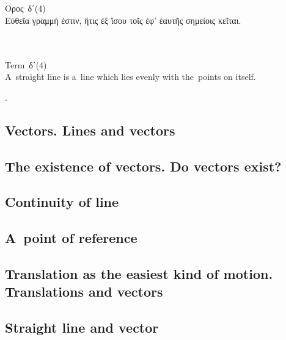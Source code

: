 {\small
\setlength{\parindent}{0pt}

\nopagebreak%
\begin{multicols}{2}
%
\\
\\[.3em]
\textgreek{Ορος}~\textgreek{δ΄}\:(4)\\[.1em]
\textgreek{Εὐθεῖα γραμμή ἐστιν, ἥτις ἐξ ἴσου τοῖς ἐφ' ἑαυτῆς σημείοις κεῖται.}

\columnbreak
%
\\
\\[.3em]
Term~\textgreek{δ΄}\:(4)\\[.1em]
A~straight line is a~line which lies evenly with the~points on itself.
%
\end{multicols}
\par}

.

\subsection{Vectors. Lines and vectors}

\subsection{The existence of vectors. Do vectors exist?}

\subsection{Continuity of line}

\subsection{A~point of reference}

\subsection{Translation as the easiest kind of motion. Translations and vectors}

\subsection{Straight line and vector}


